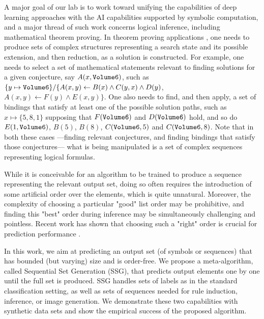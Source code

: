 \documentclass[letterpaper]{article} %
\newcommand{\citep}{\cite}
\begin{document}
A major goal of our lab is to work toward unifying the capabilities of deep learning approaches with the AI capabilities supported by symbolic computation, and a major thread of such work concerns logical inference, including mathematical theorem proving. In theorem proving applications \cite{irving2016deepmath}, one needs to produce sets of complex structures representing a search state and its possible extension, and then reduction, as a solution is constructed. For example, one needs to select a set of mathematical statements relevant to finding solutions for a given conjecture, say $A(x,{\tt Volume6})$, such as $\{y\mapsto {\tt Volume6}\} \slash \{A(x,y) \leftarrow B(x) \wedge C(y,x) \wedge D(y)$,  $A(x,y) \leftarrow F(y) \wedge E(x,y)\}$. One also needs to find, and then apply, a set of bindings that satisfy at least one of the possible solution paths, such as $x\mapsto\{5,8,1\}$ supposing that $F({\tt Volume6})$ and $D({\tt Volume6})$ hold, and so do $E(1,{\tt Volume6})$, $B(5)$, $B(8)$, $C({\tt Volume6},5)$ and $C({\tt Volume6},8)$. Note that in both these cases ---finding relevant conjectures, and finding bindings that satisfy those conjectures--- what is being manipulated is a set of complex sequences representing logical formulas.

While it is conceivable for an algorithm to be trained to produce a sequence representing the relevant output set, doing so often requires the introduction of some artificial order over the elements, which is quite unnatural. Moreover, the complexity of choosing a particular "good" list order may be prohibitive, and finding this "best" order during inference may be simultaneously challenging and pointless. Recent work has shown that choosing such a "right" order is crucial for prediction performance \citep{order_matters}. 

In this work, we aim at predicting an output set (of symbols or sequences) that has bounded (but varying) size and is order-free. We propose a meta-algorithm, called Sequential Set Generation (SSG), that predicts output elements one by one until the full set is produced. SSG handles sets of labels as in the standard classification setting, as well as sets of sequences needed for rule induction, inference, or image generation. We demonstrate these two capabilities with synthetic data sets and show the empirical success of the proposed algorithm.
% 
% 
% 
\end{document}
